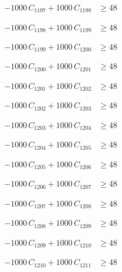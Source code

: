 \documentclass[a4paper,11pt]{article}
\begin{document}
\begin{align}
-1000\,C_{1197} + 1000\,C_{1198} &\geq 48 \nonumber
\end{align}

\begin{align}
-1000\,C_{1198} + 1000\,C_{1199} &\geq 48 \nonumber
\end{align}

\begin{align}
-1000\,C_{1199} + 1000\,C_{1200} &\geq 48 \nonumber
\end{align}

\begin{align}
-1000\,C_{1200} + 1000\,C_{1201} &\geq 48 \nonumber
\end{align}

\begin{align}
-1000\,C_{1201} + 1000\,C_{1202} &\geq 48 \nonumber
\end{align}

\begin{align}
-1000\,C_{1202} + 1000\,C_{1203} &\geq 48 \nonumber
\end{align}

\begin{align}
-1000\,C_{1203} + 1000\,C_{1204} &\geq 48 \nonumber
\end{align}

\begin{align}
-1000\,C_{1204} + 1000\,C_{1205} &\geq 48 \nonumber
\end{align}

\begin{align}
-1000\,C_{1205} + 1000\,C_{1206} &\geq 48 \nonumber
\end{align}

\begin{align}
-1000\,C_{1206} + 1000\,C_{1207} &\geq 48 \nonumber
\end{align}

\begin{align}
-1000\,C_{1207} + 1000\,C_{1208} &\geq 48 \nonumber
\end{align}

\begin{align}
-1000\,C_{1208} + 1000\,C_{1209} &\geq 48 \nonumber
\end{align}

\begin{align}
-1000\,C_{1209} + 1000\,C_{1210} &\geq 48 \nonumber
\end{align}

\begin{align}
-1000\,C_{1210} + 1000\,C_{1211} &\geq 48 \nonumber
\end{align}
\end{document}
